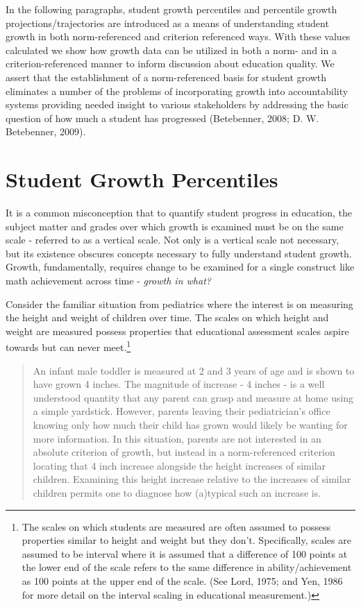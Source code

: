 \documentclass[12pt]{article}
\begin{document}
In the following paragraphs, student growth percentiles and percentile
growth projections/trajectories are introduced as a means of
understanding student growth in both norm-referenced and criterion
referenced ways. With these values calculated we show how growth data
can be utilized in both a norm- and in a criterion-referenced manner to
inform discussion about education quality. We assert that the
establishment of a norm-referenced basis for student growth eliminates a
number of the problems of incorporating growth into accountability
systems providing needed insight to various stakeholders by addressing
the basic question of how much a student has progressed (Betebenner,
2008; D. W. Betebenner, 2009).

\pagebreak

\section{Student Growth Percentiles}\label{student-growth-percentiles}

It is a common misconception that to quantify student progress in
education, the subject matter and grades over which growth is examined
must be on the same scale - referred to as a vertical scale. Not only is
a vertical scale not necessary, but its existence obscures concepts
necessary to fully understand student growth. Growth, fundamentally,
requires change to be examined for a single construct like math
achievement across time - \emph{growth in what?}

Consider the familiar situation from pediatrics where the interest is on
measuring the height and weight of children over time. The scales on
which height and weight are measured possess properties that educational
assessment scales aspire towards but can never meet.\footnote{The scales
  on which students are measured are often assumed to possess properties
  similar to height and weight but they don't. Specifically, scales are
  assumed to be interval where it is assumed that a difference of 100
  points at the lower end of the scale refers to the same difference in
  ability/achievement as 100 points at the upper end of the scale. (See
  Lord, 1975; and Yen, 1986 for more detail on the interval scaling in
  educational measurement.)}

\begin{quote}
An infant male toddler is measured at 2 and 3 years of age and is shown
to have grown 4 inches. The magnitude of increase - 4 inches - is a well
understood quantity that any parent can grasp and measure at home using
a simple yardstick. However, parents leaving their pediatrician's office
knowing only how much their child has grown would likely be wanting for
more information. In this situation, parents are not interested in an
absolute criterion of growth, but instead in a norm-referenced criterion
locating that 4 inch increase alongside the height increases of similar
children. Examining this height increase relative to the increases of
similar children permits one to diagnose how (a)typical such an increase
is.
\end{quote}
\end{document}
